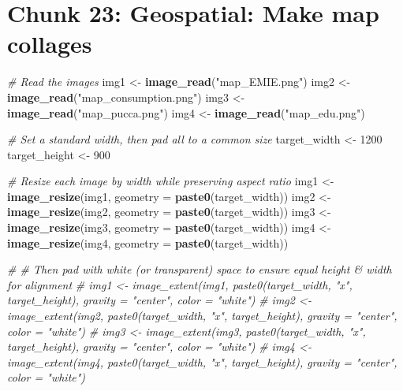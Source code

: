 \documentclass[
]{article}
\newenvironment{Shaded}{\begin{snugshade}}{\end{snugshade}}
\newcommand{\AttributeTok}[1]{\textcolor[rgb]{0.13,0.29,0.53}{#1}}
\newcommand{\CommentTok}[1]{\textcolor[rgb]{0.56,0.35,0.01}{\textit{#1}}}
\newcommand{\DecValTok}[1]{\textcolor[rgb]{0.00,0.00,0.81}{#1}}
\newcommand{\FunctionTok}[1]{\textcolor[rgb]{0.13,0.29,0.53}{\textbf{#1}}}
\newcommand{\NormalTok}[1]{#1}
\newcommand{\OtherTok}[1]{\textcolor[rgb]{0.56,0.35,0.01}{#1}}
\newcommand{\StringTok}[1]{\textcolor[rgb]{0.31,0.60,0.02}{#1}}
\begin{document}
\section*{Chunk 23: Geospatial: Make map collages}\label{chunk-23-geospatial-make-map-collages}

\begin{Shaded}
\begin{Highlighting}[]
\CommentTok{\# Read the images}
\NormalTok{img1 }\OtherTok{\textless{}{-}} \FunctionTok{image\_read}\NormalTok{(}\StringTok{"map\_EMIE.png"}\NormalTok{)}
\NormalTok{img2 }\OtherTok{\textless{}{-}} \FunctionTok{image\_read}\NormalTok{(}\StringTok{"map\_consumption.png"}\NormalTok{)}
\NormalTok{img3 }\OtherTok{\textless{}{-}} \FunctionTok{image\_read}\NormalTok{(}\StringTok{"map\_pucca.png"}\NormalTok{)}
\NormalTok{img4 }\OtherTok{\textless{}{-}} \FunctionTok{image\_read}\NormalTok{(}\StringTok{"map\_edu.png"}\NormalTok{)}

\CommentTok{\# Set a standard width, then pad all to a common size}
\NormalTok{target\_width }\OtherTok{\textless{}{-}} \DecValTok{1200}
\NormalTok{target\_height }\OtherTok{\textless{}{-}} \DecValTok{900}

\CommentTok{\# Resize each image by width while preserving aspect ratio}
\NormalTok{img1 }\OtherTok{\textless{}{-}} \FunctionTok{image\_resize}\NormalTok{(img1, }\AttributeTok{geometry =} \FunctionTok{paste0}\NormalTok{(target\_width))}
\NormalTok{img2 }\OtherTok{\textless{}{-}} \FunctionTok{image\_resize}\NormalTok{(img2, }\AttributeTok{geometry =} \FunctionTok{paste0}\NormalTok{(target\_width))}
\NormalTok{img3 }\OtherTok{\textless{}{-}} \FunctionTok{image\_resize}\NormalTok{(img3, }\AttributeTok{geometry =} \FunctionTok{paste0}\NormalTok{(target\_width))}
\NormalTok{img4 }\OtherTok{\textless{}{-}} \FunctionTok{image\_resize}\NormalTok{(img4, }\AttributeTok{geometry =} \FunctionTok{paste0}\NormalTok{(target\_width))}

\CommentTok{\# \# Then pad with white (or transparent) space to ensure equal height \& width for alignment}
\CommentTok{\# img1 \textless{}{-} image\_extent(img1, paste0(target\_width, "x", target\_height), gravity = "center", color = "white")}
\CommentTok{\# img2 \textless{}{-} image\_extent(img2, paste0(target\_width, "x", target\_height), gravity = "center", color = "white")}
\CommentTok{\# img3 \textless{}{-} image\_extent(img3, paste0(target\_width, "x", target\_height), gravity = "center", color = "white")}
\CommentTok{\# img4 \textless{}{-} image\_extent(img4, paste0(target\_width, "x", target\_height), gravity = "center", color = "white")}


\end{Highlighting}
\end{Shaded}
\end{document}
